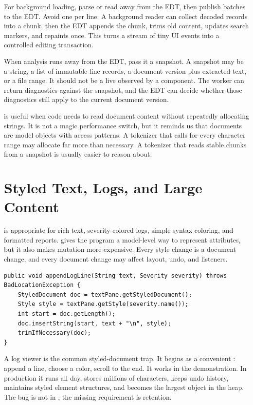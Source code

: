 For background loading, parse or read away from the EDT, then publish batches to the EDT. Avoid one  per line. A background reader can collect decoded records into a chunk, then the EDT appends the chunk, trims old content, updates search markers, and repaints once. This turns a stream of tiny UI events into a controlled editing transaction.

When analysis runs away from the EDT, pass it a snapshot. A snapshot may be a string, a list of immutable line records, a document version plus extracted text, or a file range. It should not be a live  observed by a component. The worker can return diagnostics against the snapshot, and the EDT can decide whether those diagnostics still apply to the current document version.

 is useful when code needs to read document content without repeatedly allocating strings. It is not a magic performance switch, but it reminds us that documents are model objects with access patterns. A tokenizer that calls  for every character range may allocate far more than necessary. A tokenizer that reads stable chunks from a snapshot is usually easier to reason about.

\section{Styled Text, Logs, and Large Content}

 is appropriate for rich text, severity-colored logs, simple syntax coloring, and formatted reports.  gives the program a model-level way to represent attributes, but it also makes mutation more expensive. Every style change is a document change, and every document change may affect layout, undo, and listeners.

\begin{lstlisting}[caption={Applying a severity style to an appended log line.}]
public void appendLogLine(String text, Severity severity) throws BadLocationException {
    StyledDocument doc = textPane.getStyledDocument();
    Style style = textPane.getStyle(severity.name());
    int start = doc.getLength();
    doc.insertString(start, text + "\n", style);
    trimIfNecessary(doc);
}
\end{lstlisting}

A log viewer is the common styled-document trap. It begins as a convenient : append a line, choose a color, scroll to the end. It works in the demonstration. In production it runs all day, stores millions of characters, keeps undo history, maintains styled element structures, and becomes the largest object in the heap. The bug is not in ; the missing requirement is retention.

